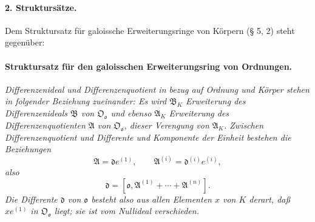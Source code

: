 \paragraph{2. Struktursätze.}
Dem Struktursatz für galoissche Erweiterungsringe von Körpern (§ 5, 2) steht gegenüber:

\paragraph{Struktursatz für den galoisschen Erweiterungsring von Ordnungen.}
\emph{Differenzenideal und Differenzenquotient in bezug auf Ordnung und Körper stehen in folgender Beziehung zueinander: Es wird $\mathfrak B_K$ Erweiterung des Differenzenideals $\mathfrak B$ von $\mathfrak O_{\mathfrak o}$ und ebenso $\mathfrak A_K$ Erweiterung des Differenzenquotienten $\mathfrak A$ von $\mathfrak O_{\mathfrak o}$, dieser Verengung von $\mathfrak A_K$. Zwischen Differenzenquotient und Differente und Komponente der Einheit bestehen die Beziehungen}
\[
\mathfrak A=\mathfrak d e^{(1)},
\qquad
\mathfrak A^{(i)}=\mathfrak d^{(i)}e^{(i)},
\]
\emph{also}
\[
\mathfrak d=[\mathfrak o,\mathfrak A^{(1)}+\cdots+\mathfrak A^{(n)}].
\]
\emph{Die Differente $\mathfrak d$ von $\mathfrak o$ besteht also aus allen Elementen $x$ von $K$ derart, daß $xe^{(1)}$ in $\mathfrak O_{\mathfrak o}$ liegt; sie ist vom Nullideal verschieden.}

